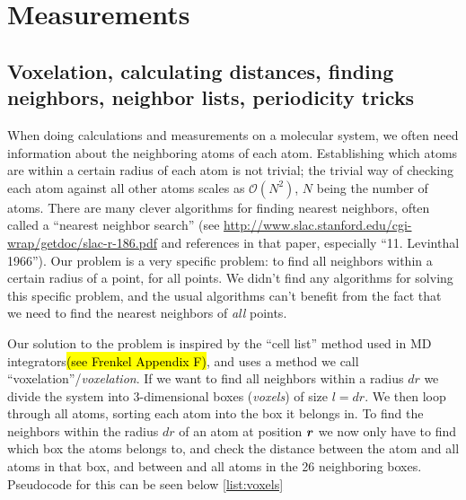 \chapter{Measurements}
\section{Voxelation, calculating distances, finding neighbors, neighbor lists, periodicity tricks\label{sec:voxelation}}
When doing calculations and measurements on a molecular system, we often need information about the neighboring atoms of each atom. Establishing which atoms are within a certain radius of each atom is not trivial; the trivial way of checking each atom against all other atoms scales as $\mathcal{O}(N^2)$, $N$ being the number of atoms. There are many clever algorithms for finding nearest neighbors, often called a ``nearest neighbor search'' (see \url{http://www.slac.stanford.edu/cgi-wrap/getdoc/slac-r-186.pdf} and references in that paper, especially ``11. Levinthal 1966''). Our problem is a very specific problem: to find all neighbors within a certain radius of a point, for all points. We didn't find any algorithms for solving this specific problem, and the usual algorithms can't benefit from the fact that we need to find the nearest neighbors of \emph{all} points.

Our solution to the problem is inspired by the ``cell list'' method used in MD integrators\hl{(see Frenkel Appendix F)}, and uses a method we call ``voxelation''/\emph{voxelation}. If we want to find all neighbors within a radius $dr$ we divide the system into 3-dimensional boxes (\emph{voxels}) of size $l = dr$. We then loop through all atoms, sorting each atom into the box it belongs in. To find the neighbors within the radius $dr$ of an atom at position $\boldsymbol{r}$ we now only have to find which box the atoms belongs to, and check the distance between the atom and all atoms in that box, and between and all atoms in the 26 neighboring boxes. Pseudocode for this can be seen below \cref{list:voxels}


